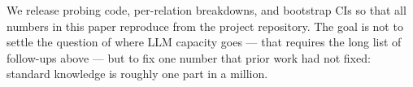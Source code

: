We release probing code, per-relation breakdowns, and bootstrap CIs so that all numbers in this paper reproduce from the project repository. The goal is not to settle the question of where LLM capacity goes --- that requires the long list of follow-ups above --- but to fix one number that prior work had not fixed: standard knowledge is roughly one part in a million.
